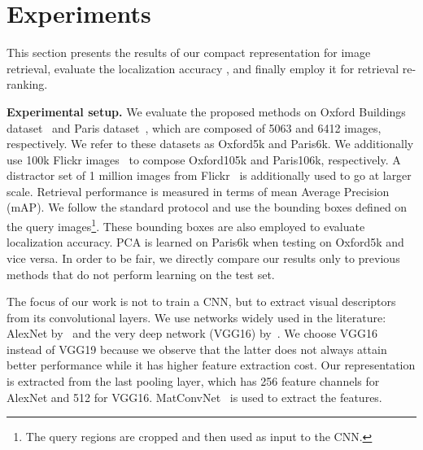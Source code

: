 \section{Experiments}
\label{sec:experiments}
This section presents the results of our compact representation for image retrieval, evaluate the localization accuracy \deeploc, and finally employ it for retrieval re-ranking.

\textbf{Experimental setup.}
We evaluate the proposed methods on Oxford Buildings dataset~\citep{PCISZ07} and Paris dataset~\citep{PCISZ08}, which are composed of 5063 and 6412 images, respectively.
We refer to these datasets as Oxford5k and Paris6k.
We additionally use 100k Flickr images~\citep{PCISZ07} to compose Oxford105k and Paris106k, respectively. A distractor set of 1 million images from Flickr~\citep{JDS10a} is additionally used to go at larger scale.
Retrieval performance is measured in terms of mean Average Precision (mAP).
We follow the standard protocol and use the bounding boxes defined on the query images\footnote{The query regions are cropped and then used as input to the CNN.}.
These bounding boxes are also employed to evaluate localization accuracy. 
PCA is learned on Paris6k when testing on Oxford5k and vice versa. In order to be fair, we directly compare our results only to previous methods that do not perform learning on the test set.

The focus of our work is not to train a CNN, but to extract visual descriptors from its convolutional layers.
We use networks widely used in the literature: AlexNet by~\cite{KSH12} and the very deep network (VGG16) by~\cite{SZ14}. 
We choose VGG16 instead of VGG19 because we observe that the latter does not always attain better performance while it has higher feature extraction cost.
Our representation is extracted from the last pooling layer, which has 256 feature channels for AlexNet and 512 for VGG16.
MatConvNet~\citep{VL14} is used to extract the features.

